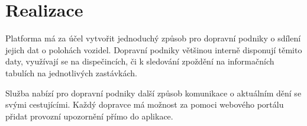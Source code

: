 \setlength{\headheight}{15.04742pt}
\chapter{Realizace}
Platforma má za účel vytvořit jednoduchý způsob pro dopravní podniky o sdílení jejich dat o polohách vozidel.
Dopravní podniky většinou interně disponují těmito daty, využívají se na dispečincích, či k sledování zpoždění na informačních tabulích na jednotlivých zastávkách.\par
Služba nabízí pro dopravní podniky další způsob komunikace o aktuálním dění se svými cestujícími. Každý dopravce má možnost za pomoci webového portálu přidat provozní upozornění přímo do aplikace.



